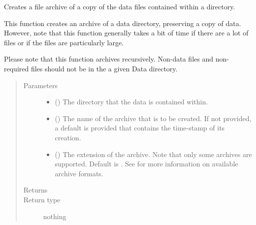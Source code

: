\documentclass[letterpaper,10pt,english]{sphinxmanual}
\begin{document}
\begin{fulllineitems}
\label{\detokenize{python_docstrings/IfA_Smeargle.bravo.archiving:IfA_Smeargle.bravo.archiving.duplicate_archive_data_files}}
Creates a file archive of a copy of the data files contained within a
directory.

This function creates an archive of a data directory, preserving a copy
of data. However, note that this function generally takes a bit of time
if there are a lot of files or if the files are particularly large.

Please note that this function archives recursively. Non-data files and
non-required files should not be in the a given Data directory.
\begin{quote}\begin{description}
\item[{Parameters}] \leavevmode\begin{itemize}
\item {} 
 () \textendash{} The directory that the data is contained within.

\item {} 
 (\sphinxstyleliteralemphasis{\sphinxupquote{ (}}\sphinxstyleliteralemphasis{\sphinxupquote{)}}) \textendash{} The name of the archive that is to be created. If not provided, a
default is provided that contains the time-stamp of its creation.

\item {} 
 (\sphinxstyleliteralemphasis{\sphinxupquote{ (}}\sphinxstyleliteralemphasis{\sphinxupquote{)}}) \textendash{} The extension of the archive. Note that only some archives are
supported. Default is . See
 for more information on
available archive formats.

\end{itemize}

\item[{Returns}] \leavevmode


\item[{Return type}] \leavevmode
nothing

\end{description}\end{quote}

\end{fulllineitems}
\end{document}
